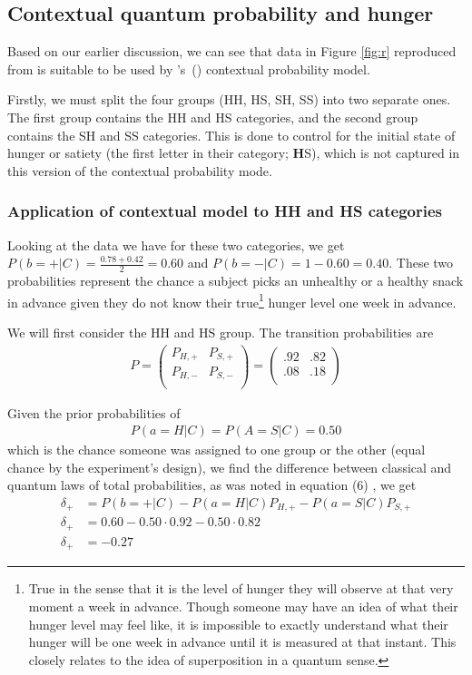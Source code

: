 \documentclass[12pt]{article}
\newcommand\citepos[1]{\citeauthor*{#1}'s\ (\citeyear{#1})}
\begin{document}
	\subsection{Contextual quantum probability and hunger}
	Based on our earlier discussion, we can see that data in Figure \ref{fig:r} reproduced from \cite{read_leeuwen_1998} is suitable to be used by \citepos{khrennikov_haven_2009} contextual probability model. 
	
	Firstly, we must split the four groups (HH, HS, SH, SS) into two separate ones. The first group contains the HH and HS categories, and the second group contains the SH and SS categories. This is done to control for the initial state of hunger or satiety (the first letter in their category; \textbf{H}S), which is not captured in this version of the contextual probability mode. 
	
	\subsubsection{Application of contextual model to HH and HS categories}	
	Looking at the data we have for these two categories, we get $P(b=+|C) = \frac{0.78+0.42}{2}= 0.60$ and $P(b=-|C) = 1-0.60=0.40$. These two probabilities represent the chance a subject picks an unhealthy or a healthy snack in advance given they do not know their true\footnote{True in the sense that it is the level of hunger they will observe at that very moment a week in advance. Though someone may have an idea of what their hunger level may feel like, it is impossible to exactly understand what their hunger will be one week in advance until it is measured at that instant. This closely relates to the idea of superposition in a quantum sense.} hunger level one week in advance. 
	
	We will first consider the HH and HS group. The transition probabilities are 
	\begin{align}
	P =
	\left( \begin{array}{cc}
	P_{H, +} & P_{S, +} \\
	P_{H, -} & P_{S, -}  \\
	\end{array}  \right)
	= 
	\left( \begin{array}{cc}
	.92 & .82 \\
	.08 & .18  \\
	\end{array} 
	\right)
	\end{align}
	
	Given the prior probabilities of 
	\begin{align}
	P(a=H|C) = P(A=S|C) = 0.50
	\end{align}
	 which is the chance someone was assigned to one group or the other (equal chance by the experiment's design), we find the difference between classical and quantum laws of total probabilities, as was noted in equation (6) , we get
	 \begin{align}
	\delta_{+} &= P(b=+|C) - P(a=H|C)P_{H, +} - P(a=S|C)P_{S, +} \\
	\delta_{+} &= 0.60 - 0.50 \cdot 0.92 - 0.50 \cdot 0.82 \\
	\delta_{+} &= -0.27
	\end{align}
	
\end{document}
